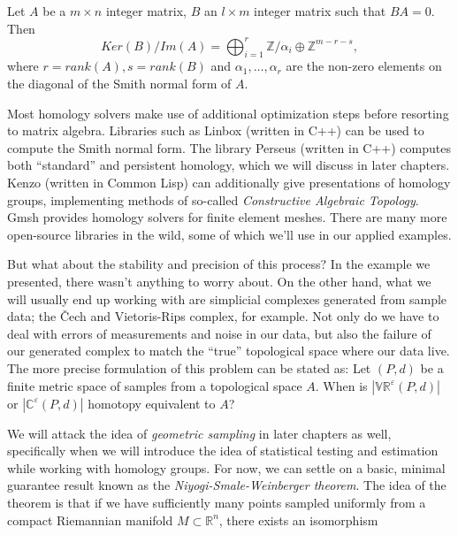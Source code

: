 \begin{theorem}
  Let $A$ be a $m \times n$ integer matrix, $B$ an $l \times m$ integer matrix such that $BA = 0$. Then
  \begin{equation*}
    Ker(B)/Im(A) = \bigoplus_{i=1}^r \mathbb{Z}/\alpha_i \oplus \mathbb{Z}^{m-r-s},
  \end{equation*}
  where $r = rank(A), s = rank(B)$ and $\alpha_{1}, \ldots, \alpha_{r}$ are the non-zero elements on the diagonal of the Smith normal form of $A$.
\end{theorem}

Most homology solvers make use of additional optimization steps before resorting to matrix algebra. Libraries such as Linbox \cite{linbox} (written in C++) can be used to compute the Smith normal form. The library Perseus \cite{perseus} (written in C++) computes both ``standard'' and persistent homology, which we will discuss in later chapters. Kenzo \cite{kenzo} (written in Common Lisp) can additionally give presentations of homology groups, implementing methods of so-called \textit{Constructive Algebraic Topology}. Gmsh \cite{gmsh} provides homology solvers for finite element meshes. There are many more open-source libraries in the wild, some of which we'll use in our applied examples.

But what about the stability and precision of this process? In the example we presented, there wasn't anything to worry about. On the other hand, what we will usually end up working with are simplicial complexes generated from sample data; the Čech and Vietoris-Rips complex, for example. Not only do we have to deal with errors of measurements and noise in our data, but also the failure of our generated complex to match the ``true'' topological space where our data live. The more precise formulation of this problem can be stated as: Let $(P, d)$ be a finite metric space of samples from a topological space $A$. When is $|\mathbb{VR}^{\varepsilon}(P, d)|$ or $|\mathbb{C}^{\varepsilon}(P, d)|$ homotopy equivalent to $A$?

We will attack the idea of \textit{geometric sampling} in later chapters as well, specifically when we will introduce the idea of statistical testing and estimation while working with homology groups. For now, we can settle on a basic, minimal guarantee result known as the \textit{Niyogi-Smale-Weinberger theorem}. The idea of the theorem is that if we have sufficiently many points sampled uniformly from a compact Riemannian manifold $M \subset \mathbb{R}^{n}$, there exists an isomorphism


